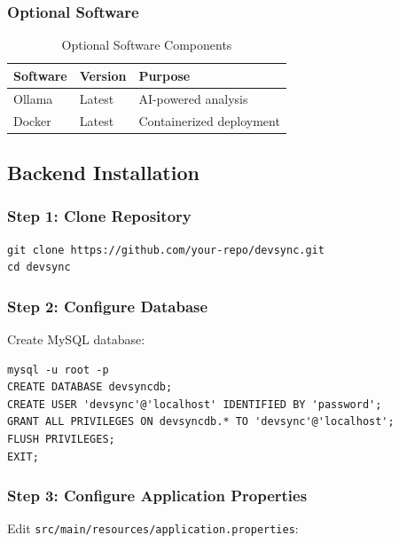 \documentclass[12pt,a4paper]{article}
\begin{document}
    \subsubsection{Optional Software}

    \begin{table}[H]
        \caption{Optional Software Components}
        \begin{tabular}{|l|l|p{5cm}|}
            \hline
            \textbf{Software} & \textbf{Version} & \textbf{Purpose} \\
            \hline
            Ollama & Latest & AI-powered analysis \\
            \hline
            Docker & Latest & Containerized deployment \\
            \hline
        \end{tabular}
    \end{table}

    \subsection{Backend Installation}

    \subsubsection{Step 1: Clone Repository}

    \begin{verbatim}
git clone https://github.com/your-repo/devsync.git
cd devsync
    \end{verbatim}

    \subsubsection{Step 2: Configure Database}

    Create MySQL database:
    \begin{verbatim}
mysql -u root -p
CREATE DATABASE devsyncdb;
CREATE USER 'devsync'@'localhost' IDENTIFIED BY 'password';
GRANT ALL PRIVILEGES ON devsyncdb.* TO 'devsync'@'localhost';
FLUSH PRIVILEGES;
EXIT;
    \end{verbatim}

    \subsubsection{Step 3: Configure Application Properties}

    Edit \texttt{src/main/resources/application.properties}:
\end{document}
